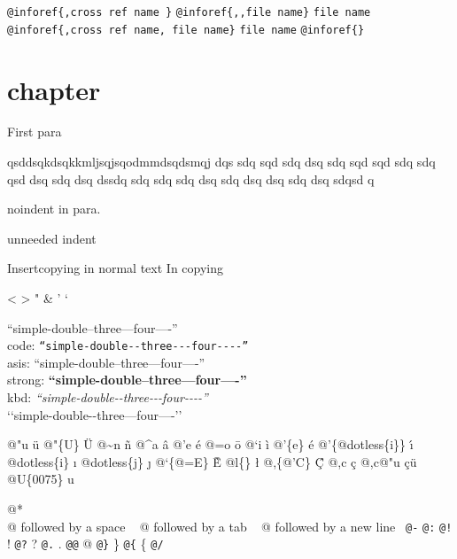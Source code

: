 \documentclass{book}
\makeatletter
\renewcommand\mainmatter{\clearpage\@mainmattertrue\pagenumbering{arabic}}
\newcommand\GNUTexinfomainmatter{\mainmatter}
\newcommand{\GNUTexinfosetsingleheader}{\pagestyle{single}}
\makeatother
\begin{document}
\begin{titlepage}
\texttt{@inforef\{,cross ref name \}} 
\texttt{@inforef\{,,file name\}} \texttt{file name}
\texttt{@inforef\{,cross ref name, file name\}} \texttt{file name}
\texttt{@inforef\{\}} 


\end{titlepage}
\GNUTexinfosetsingleheader{}%
\GNUTexinfomainmatter
\tableofcontents\newpage





\chapter{chapter}
\label{anchor:chapter}%

First para

\noindent{}qsddsqkdsqkkmljsqjsqodmmdsqdsmqj dqs sdq sqd sdq dsq sdq sqd sqd sdq sdq 
qsd dsq sdq dsq dssdq sdq sdq sdq dsq sdq dsq dsq sdq dsq sdqsd q

\noindent{}noindent in para.

unneeded indent

Insertcopying in normal text
In copying

<
>
"
\&
'
`

``simple-double--three---four----''\leavevmode{}\\
code: \texttt{``simple-double{-}{-}three{-}{-}{-}four{-}{-}{-}-''} \leavevmode{}\\
asis: ``simple-double--three---four----'' \leavevmode{}\\
strong: \textbf{``simple-double--three---four----''} \leavevmode{}\\
kbd: {\ttfamily\textsl{``simple-double{-}{-}three{-}{-}{-}four{-}{-}{-}-''}} \leavevmode{}\\

`\hbox{}`simple-double-\hbox{}-three---four----'\hbox{}'\leavevmode{}\\

%
%
%
%

@"u \"{u} 
@"\{U\} \"{U} 
@\~{}n \~{n}
@\^{}a \^{a}
@'e \'{e}
@=o \={o}
@`i \`{i}
@'\{e\} \'{e}
@'\{@dotless\{i\}\} \'{\i{}} 
@dotless\{i\} \i{}
@dotless\{j\} \j{}
@`\{@=E\} \`{\={E}} 
@l\{\} \l{}
@,\{@'C\} \c{\'{C}}
@,c \c{c}
@,c@"u \c{c}\"{u} \leavevmode{}\\

@U\{0075\} u

@* \leavevmode{}\\
@ followed by a space
\ {}
@ followed by a tab
\ {}
@ followed by a new line
\ {}\texttt{@-} \-{}
\texttt{@:} \@
\texttt{@!} \@!
\texttt{@?} \@?
\texttt{@.} \@.
\texttt{@@} @
\texttt{@\}} \}
\texttt{@\{} \{
\texttt{@/} 
\end{document}

